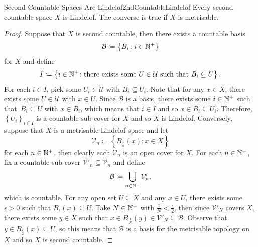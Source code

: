 \documentclass[math]{amznotes}
\theoremstyle{remark}
\begin{document}
\begin{probox}{Second Countable Spaces Are Lindelof}{2ndCountableLindelof}
    Every second countable space $X$ is Lindelof. The converse is true if $X$ is metrisable.
    \tcblower
    \begin{proof}
        Suppose that $X$ is second countable, then there exists a countable basis 
        \begin{equation*}
            \mathcal{B} \coloneqq \left\{B_i \colon i \in \mathbb{N}^+\right\}
        \end{equation*}
        for $X$ and define
        \begin{equation*}
            I \coloneqq \left\{i \in \mathbb{N}^+ \colon \textrm{there exists some } U \in \mathcal{U} \textrm{ such that } B_i \subseteq U\right\}.
        \end{equation*}
        For each $i \in I$, pick some $U_i \in \mathcal{U}$ with $B_i \subseteq U_i$. Note that for any $x \in X$, there exists some $U \in \mathcal{U}$ with $x \in U$. Since $\mathcal{B}$ is a basis, there exists some $i \in \mathbb{N}^+$ such that~$B_i \subseteq U$ with $x \in B_i$, which means that $i \in I$ and so $x \in B_i \subseteq U_i$. Therefore,~$\left\{U_i\right\}_{i \in I}$ is a countable sub-cover for $X$ and so $X$ is Lindelof. Conversely, suppose that $X$ is a metrisable Lindelof space and let 
        \begin{equation*}
            \mathcal{V}_n \coloneqq \left\{B_{\frac{1}{n}}\left(x\right) \colon x \in X\right\}
        \end{equation*}
        for each $n \in \mathbb{N}^+$, then clearly each $\mathcal{V}_n$ is an open cover for $X$. For each $n \in \mathbb{N}^+$, fix a countable sub-cover $\mathcal{V}'_n \subseteq \mathcal{V}_n$ and define 
        \begin{equation*}
            \mathcal{B} \coloneqq \bigcup_{n \in \mathbb{N}^+}\mathcal{V}'_n,
        \end{equation*}
        which is countable. For any open set $U \subseteq X$ and any $x \in U$, there exists some $\epsilon > 0$ such that $B_{\epsilon}\left(x\right) \subseteq U$. Take $N \in \mathbb{N}^+$ with $\frac{1}{N} < \frac{\epsilon}{2}$, then since $\mathcal{V}'_N$ covers $X$, there exists some $y \in X$ such that $x \in B_{\frac{1}{N}}\left(y\right) \in \mathcal{V}'_N \subseteq \mathcal{B}$. Observe that $y \in B_{\frac{\epsilon}{2}}\left(x\right) \subseteq U$, so this means that $\mathcal{B}$ is a basis for the metrisable topology on $X$ and so $X$ is second countable.
    \end{proof}
\end{probox}
\end{document}
